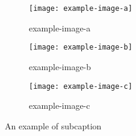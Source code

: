 \documentclass{article}
\begin{document}
\begin{figure}\centering
\begin{subfigure}[b]{0.3\textwidth}
    \texttt{[image: example-image-a]}
    \caption{example-image-a} \label{subfig:a}
\end{subfigure}
\begin{subfigure}[b]{0.3\textwidth}
    \texttt{[image: example-image-b]}
    \caption{example-image-b} \label{subfig:b}
\end{subfigure}
\begin{subfigure}[b]{0.3\textwidth}
    \texttt{[image: example-image-c]}
    \caption{example-image-c} \label{subfig:c}
\end{subfigure}
\caption{An example of subcaption}\label{subcaption}
\end{figure}
\end{document}
